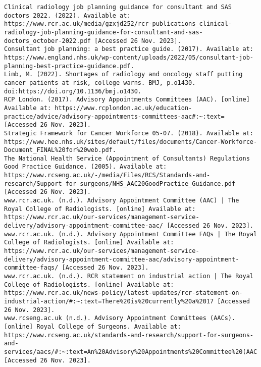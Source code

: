 \documentclass[12pt, a4paper]{article}
\begin{document}
\begin{lstlisting}[breaklines=true]
Clinical radiology job planning guidance for consultant and SAS doctors 2022. (2022). Available at: https://www.rcr.ac.uk/media/gzxjd252/rcr-publications_clinical-radiology-job-planning-guidance-for-consultant-and-sas-doctors_october-2022.pdf [Accessed 26 Nov. 2023].
Consultant job planning: a best practice guide. (2017). Available at: https://www.england.nhs.uk/wp-content/uploads/2022/05/consultant-job-planning-best-practice-guidance.pdf.
Limb, M. (2022). Shortages of radiology and oncology staff putting cancer patients at risk, college warns. BMJ, p.o1430. doi:https://doi.org/10.1136/bmj.o1430.
RCP London. (2017). Advisory Appointments Committees (AAC). [online] Available at: https://www.rcplondon.ac.uk/education-practice/advice/advisory-appointments-committees-aac#:~:text= [Accessed 26 Nov. 2023].
Strategic Framework for Cancer Workforce 05-07. (2018). Available at: https://www.hee.nhs.uk/sites/default/files/documents/Cancer-Workforce-Document_FINAL%20for%20web.pdf.
The National Health Service (Appointment of Consultants) Regulations Good Practice Guidance. (2005). Available at: https://www.rcseng.ac.uk/-/media/Files/RCS/Standards-and-research/Support-for-surgeons/NHS_AAC20GoodPractice_Guidance.pdf [Accessed 26 Nov. 2023].
www.rcr.ac.uk. (n.d.). Advisory Appointment Committee (AAC) | The Royal College of Radiologists. [online] Available at: https://www.rcr.ac.uk/our-services/management-service-delivery/advisory-appointment-committee-aac/ [Accessed 26 Nov. 2023].
www.rcr.ac.uk. (n.d.). Advisory Appointment Committee FAQs | The Royal College of Radiologists. [online] Available at: https://www.rcr.ac.uk/our-services/management-service-delivery/advisory-appointment-committee-aac/advisory-appointment-committee-faqs/ [Accessed 26 Nov. 2023].
www.rcr.ac.uk. (n.d.). RCR statement on industrial action | The Royal College of Radiologists. [online] Available at: https://www.rcr.ac.uk/news-policy/latest-updates/rcr-statement-on-industrial-action/#:~:text=There%20is%20currently%20a%2017 [Accessed 26 Nov. 2023].
www.rcseng.ac.uk (n.d.). Advisory Appointment Committees (AACs). [online] Royal College of Surgeons. Available at: https://www.rcseng.ac.uk/standards-and-research/support-for-surgeons-and-services/aacs/#:~:text=An%20Advisory%20Appointments%20Committee%20(AAC [Accessed 26 Nov. 2023].
\end{lstlisting}


\end{document}
